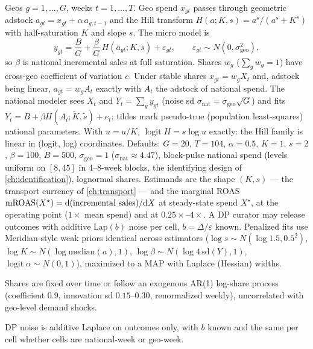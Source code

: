 Geos $g = 1,\ldots,G$, weeks $t = 1,\ldots,T$. Geo spend $x_{gt}$ passes through geometric adstock $a_{gt} = x_{gt} + \alpha\, a_{g,t-1}$ and the Hill transform $H(a;K,s) = a^s/(a^s + K^s)$ with half-saturation $K$ and slope $s$. The micro model is
\begin{equation}
y_{gt} = \frac{B}{G} + \frac{\beta}{G}\, H(a_{gt};K,s) + \varepsilon_{gt}, \qquad \varepsilon_{gt} \sim N(0,\sigma_{\mathrm{geo}}^2),
\label{eq:aggregation:micro}
\end{equation}
so $\beta$ is national incremental sales at full saturation. Shares $w_g$ ($\sum_g w_g = 1$) have cross-geo coefficient of variation $c$. Under stable shares $x_{gt} = w_g X_t$ and, adstock being linear, $a_{gt} = w_g A_t$ exactly with $A_t$ the adstock of national spend. The national modeler sees $X_t$ and $Y_t = \sum_g y_{gt}$ (noise sd $\sigma_{\mathrm{nat}} = \sigma_{\mathrm{geo}}\sqrt{G}$) and fits $Y_t = B + \beta H(A_t;\tilde K,\tilde s) + e_t$; tildes mark pseudo-true (population least-squares) national parameters. With $u = a/K$, $\operatorname{logit} H = s\log u$ exactly: the Hill family is linear in (logit, log) coordinates. Defaults: $G = 20$, $T = 104$, $\alpha = 0.5$, $K = 1$, $s = 2$, $\beta = 100$, $B = 500$, $\sigma_{\mathrm{geo}} = 1$ ($\sigma_{\mathrm{nat}} \approx 4.47$), block-pulse national spend (levels uniform on $[8,45]$ in 4--8-week blocks, the identifying design of \cref{ch:identification}), lognormal shares. Estimands are the shape $(K,s)$ --- the transport currency of \cref{ch:transport} --- and the marginal ROAS $\mathrm{mROAS}(X^\star) = \mathrm{d}(\text{incremental sales})/\mathrm{d} X$ at steady-state spend $X^\star$, at the operating point ($1\times$ mean spend) and at $0.25\times$--$4\times$. A DP curator may release outcomes with additive $\mathrm{Lap}(b)$ noise per cell, $b = \Delta/\varepsilon$ known. Penalized fits use Meridian-style weak priors identical across estimators ($\log s \sim N(\log 1.5, 0.5^2)$, $\log K \sim N(\log\mathrm{median}(a), 1)$, $\log\beta \sim N(\log 4\,\mathrm{sd}(Y), 1)$, $\operatorname{logit}\alpha \sim N(0,1)$), maximized to a MAP with Laplace (Hessian) widths.

\begin{assumption}\label{aggregation:ass:shares}
Shares are fixed over time or follow an exogenous AR(1) log-share process (coefficient $0.9$, innovation sd $0.15$--$0.30$, renormalized weekly), uncorrelated with geo-level demand shocks.
\end{assumption}

\begin{assumption}\label{aggregation:ass:dp}
DP noise is additive Laplace on outcomes only, with $b$ known and the same per cell whether cells are national-week or geo-week.
\end{assumption}

